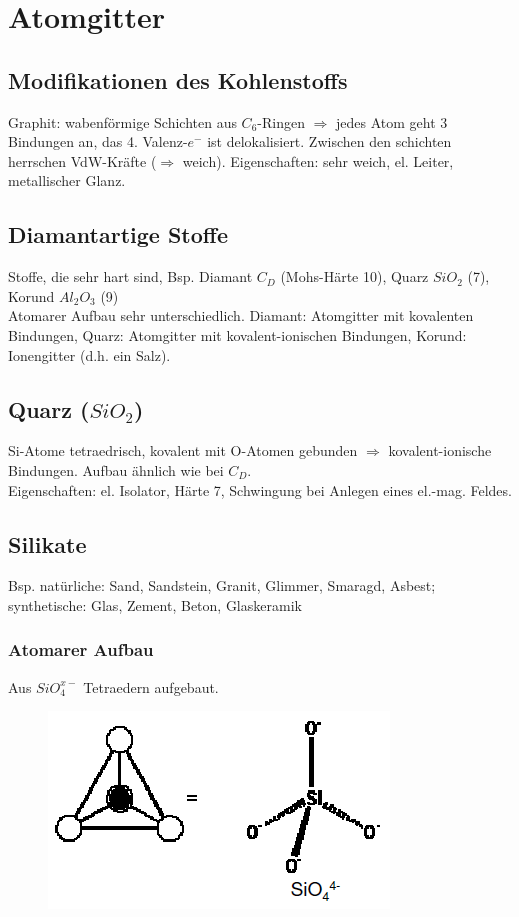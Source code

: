 \section{Atomgitter}

\subsection{Modifikationen des Kohlenstoffs}
Graphit: wabenförmige Schichten aus $C_6$-Ringen $\Rightarrow$ jedes Atom geht 3 Bindungen an, das 4. Valenz-$e^-$ ist delokalisiert. Zwischen den schichten herrschen VdW-Kräfte ($\Rightarrow$ weich). Eigenschaften: sehr weich, el. Leiter, metallischer Glanz.

\subsection{Diamantartige Stoffe}
Stoffe, die sehr hart sind, Bsp. Diamant $C_D$ (Mohs-Härte 10), Quarz $SiO_2$ (7), Korund $Al_2O_3$ (9) \\

Atomarer Aufbau sehr unterschiedlich. Diamant: Atomgitter mit kovalenten Bindungen, Quarz: Atomgitter mit kovalent-ionischen Bindungen, Korund: Ionengitter (d.h. ein Salz).

\subsection{Quarz ($SiO_2$)}
Si-Atome tetraedrisch, kovalent mit O-Atomen gebunden $\Rightarrow$ kovalent-ionische Bindungen. Aufbau ähnlich wie bei $C_D$. \\

Eigenschaften: el. Isolator, Härte 7, Schwingung bei Anlegen eines el.-mag. Feldes. \\

\subsection{Silikate}
Bsp. natürliche: Sand, Sandstein, Granit, Glimmer, Smaragd, Asbest; synthetische: Glas, Zement, Beton, Glaskeramik \\

\subsubsection{Atomarer Aufbau}
Aus $SiO_4^{x-}$ Tetraedern aufgebaut. \\

\begin{figure}[htbp]
	\centering
	\includegraphics[width=0.4\linewidth]{images/8_SiO4.png}
\end{figure}

